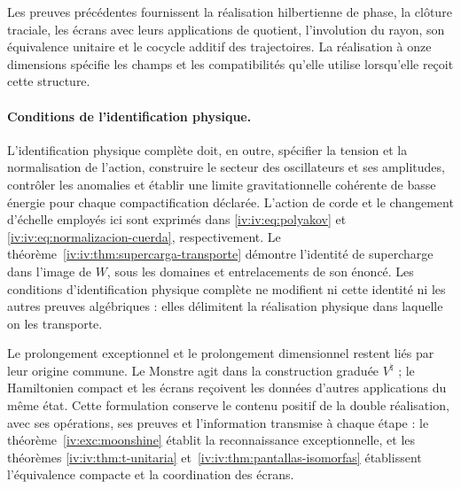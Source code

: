 Les preuves précédentes fournissent la réalisation
hilbertienne de phase, la clôture traciale, les écrans
avec leurs applications de quotient, l’involution du rayon,
son équivalence unitaire et le cocycle additif des
trajectoires. La réalisation à onze dimensions
spécifie les champs et les compatibilités qu’elle
utilise lorsqu’elle reçoit cette structure.

\paragraph{Conditions de l’identification physique.}
\label{iv:iv:condiciones-realizacion-fisica}
L’identification physique complète doit, en outre,
spécifier la tension et la normalisation de l’action,
construire le secteur des oscillateurs et ses amplitudes,
contrôler les anomalies et établir une limite
gravitationnelle cohérente de basse énergie pour chaque
compactification déclarée.
L’action de corde et le changement d’échelle employés
ici sont exprimés dans \eqref{iv:iv:eq:polyakov}
et \eqref{iv:iv:eq:normalizacion-cuerda}, respectivement.
Le théorème~\ref{iv:iv:thm:supercarga-transporte}
démontre l’identité de supercharge dans l’image de
\(W\), sous les domaines et entrelacements de son
énoncé. Les conditions d’identification physique
complète ne modifient ni cette identité ni les autres
preuves algébriques : elles délimitent la réalisation physique
dans laquelle on les transporte.

Le prolongement exceptionnel et le prolongement dimensionnel
restent liés par leur origine commune. Le
Monstre agit dans la construction graduée
\(V^\natural\) ; le Hamiltonien compact et les
écrans reçoivent les données d’autres applications du
même état. Cette formulation conserve le
contenu positif de la double réalisation,
avec ses opérations, ses preuves et l’information
transmise à chaque étape : le théorème~\ref{iv:exc:moonshine}
établit la reconnaissance exceptionnelle, et les théorèmes
\ref{iv:iv:thm:t-unitaria} et~\ref{iv:iv:thm:pantallas-isomorfas}
établissent l’équivalence compacte et la coordination des écrans.
